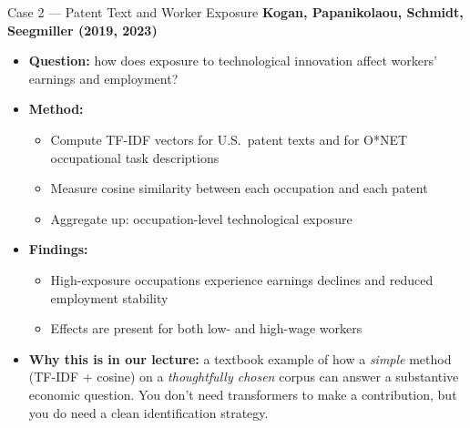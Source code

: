 \documentclass[10pt,english,aspectratio=169]{beamer}
\begin{document}
\begin{frame}{Case 2 --- Patent Text and Worker Exposure}
\textbf{Kogan, Papanikolaou, Schmidt, Seegmiller (2019, 2023)}

\medskip
\begin{itemize}
\item \textbf{Question:} how does exposure to technological innovation affect workers' earnings and employment?

\medskip
\item \textbf{Method:}
\begin{itemize}
    \item Compute TF-IDF vectors for U.S.\ patent texts and for O*NET occupational task descriptions
    \item Measure cosine similarity between each occupation and each patent
    \item Aggregate up: occupation-level technological exposure
\end{itemize}

\medskip
\item \textbf{Findings:}
\begin{itemize}
    \item High-exposure occupations experience earnings declines and reduced employment stability
    \item Effects are present for both low- and high-wage workers
\end{itemize}

\medskip
\item \textbf{Why this is in our lecture:} a textbook example of how a \emph{simple} method (TF-IDF + cosine) on a \emph{thoughtfully chosen} corpus can answer a substantive economic question. You don't need transformers to make a contribution, but you do need a clean identification strategy.
\end{itemize}
\end{frame}
\end{document}
